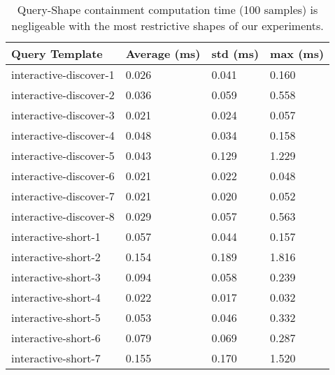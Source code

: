 \begin{table}
	\begin{center}
		\begin{tabular}{|l|l|l|l|}
			\hline
			Query Template & Average (ms) & std (ms) & max (ms) \\
			\hline
			interactive-discover-1 & 0.026 & 0.041 & 0.160 \\
			\hline
			interactive-discover-2 & 0.036 & 0.059 & 0.558 \\
			\hline
			interactive-discover-3 & 0.021 & 0.024 & 0.057 \\
			\hline
			interactive-discover-4 & 0.048 & 0.034 & 0.158 \\
			\hline
			interactive-discover-5 & 0.043 & 0.129 & 1.229 \\
			\hline
			interactive-discover-6 & 0.021 & 0.022 & 0.048 \\
			\hline
			interactive-discover-7 & 0.021 & 0.020 & 0.052 \\
			\hline
			interactive-discover-8 & 0.029 & 0.057 & 0.563 \\
			\hline
			interactive-short-1 & 0.057 & 0.044 & 0.157 \\
			\hline
			interactive-short-2 & 0.154 & 0.189 & 1.816 \\
			\hline
			interactive-short-3 & 0.094 & 0.058 & 0.239 \\
			\hline
			interactive-short-4 & 0.022 & 0.017 & 0.032 \\
			\hline
			interactive-short-5 & 0.053 & 0.046 & 0.332 \\
			\hline
			interactive-short-6 & 0.079 & 0.069 & 0.287 \\
			\hline
			interactive-short-7 & 0.155 & 0.170 & 1.520 \\
			\hline
		\end{tabular}
	\end{center}
	\caption{Query-Shape containment computation time (100 samples) is negligeable with the most restrictive shapes of our experiments.}
	\label{tab:queryShapeContainmentEval}
\end{table}